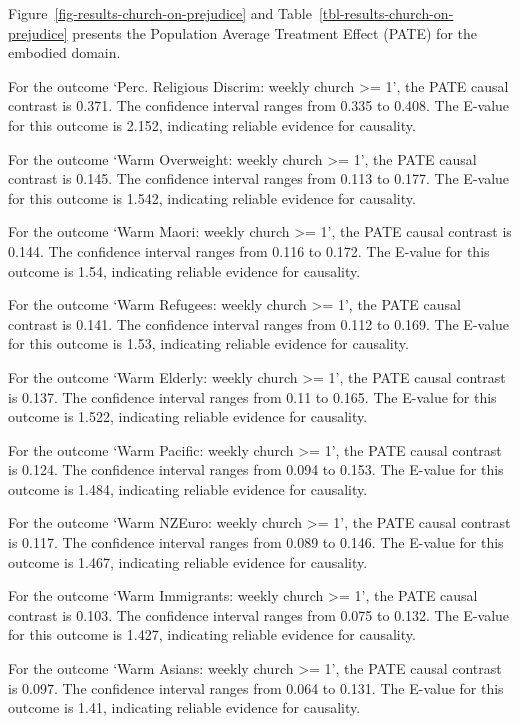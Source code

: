 \documentclass[
  singlecolumn]{article}
\begin{document}
Figure~\ref{fig-results-church-on-prejudice} and
Table~\ref{tbl-results-church-on-prejudice} presents the Population
Average Treatment Effect (PATE) for the embodied domain.

For the outcome `Perc. Religious Discrim: weekly church \textgreater=
1', the PATE causal contrast is 0.371. The confidence interval ranges
from 0.335 to 0.408. The E-value for this outcome is 2.152, indicating
reliable evidence for causality.

For the outcome `Warm Overweight: weekly church \textgreater= 1', the
PATE causal contrast is 0.145. The confidence interval ranges from 0.113
to 0.177. The E-value for this outcome is 1.542, indicating reliable
evidence for causality.

For the outcome `Warm Maori: weekly church \textgreater= 1', the PATE
causal contrast is 0.144. The confidence interval ranges from 0.116 to
0.172. The E-value for this outcome is 1.54, indicating reliable
evidence for causality.

For the outcome `Warm Refugees: weekly church \textgreater= 1', the PATE
causal contrast is 0.141. The confidence interval ranges from 0.112 to
0.169. The E-value for this outcome is 1.53, indicating reliable
evidence for causality.

For the outcome `Warm Elderly: weekly church \textgreater= 1', the PATE
causal contrast is 0.137. The confidence interval ranges from 0.11 to
0.165. The E-value for this outcome is 1.522, indicating reliable
evidence for causality.

For the outcome `Warm Pacific: weekly church \textgreater= 1', the PATE
causal contrast is 0.124. The confidence interval ranges from 0.094 to
0.153. The E-value for this outcome is 1.484, indicating reliable
evidence for causality.

For the outcome `Warm NZEuro: weekly church \textgreater= 1', the PATE
causal contrast is 0.117. The confidence interval ranges from 0.089 to
0.146. The E-value for this outcome is 1.467, indicating reliable
evidence for causality.

For the outcome `Warm Immigrants: weekly church \textgreater= 1', the
PATE causal contrast is 0.103. The confidence interval ranges from 0.075
to 0.132. The E-value for this outcome is 1.427, indicating reliable
evidence for causality.

For the outcome `Warm Asians: weekly church \textgreater= 1', the PATE
causal contrast is 0.097. The confidence interval ranges from 0.064 to
0.131. The E-value for this outcome is 1.41, indicating reliable
evidence for causality.
\end{document}
